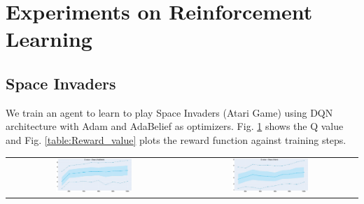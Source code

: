 \section{Experiments on Reinforcement Learning}
\label{sec:RL}
\subsection{Space Invaders}
We train an agent to learn to play Space Invaders (Atari Game) using DQN \cite{DQN_RL} architecture with Adam \cite{Adam} and AdaBelief \cite{zhuang_adabelief_2020} as optimizers. Fig. \ref{table:Q_value} shows the Q value and Fig. \ref{table:Reward_value} plots the reward function against training steps.
\begin{table}[htbp]
    \begin{center}
    \begin{tabular}{c c}

    \includegraphics[width=0.45\textwidth]{../openreview/Reproducibility_Challenge_2020/Reproduced_figures/RL/Adabelief_Q.jpeg} & \includegraphics[width=0.45\textwidth]{../openreview/Reproducibility_Challenge_2020/Reproduced_figures/RL/Adam_Q.jpeg}  \\
    \end{tabular}
    \vspace{2mm}
     \label{table:Q_value}
    \end{center}
\end{table}

